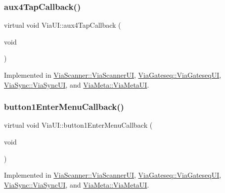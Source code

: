 \mbox{\label{class_via_u_i_a0a43c527f027d11b266080d8cacb1d65}} 
\subsubsection{\texorpdfstring{aux4\+Tap\+Callback()}{aux4TapCallback()}}
{\footnotesize\ttfamily virtual void Via\+U\+I\+::aux4\+Tap\+Callback (\begin{DoxyParamCaption}\item[{void}]{ }\end{DoxyParamCaption})\hspace{0.3cm}{\ttfamily [pure virtual]}}



Implemented in \mbox{\hyperlink{class_via_scanner_1_1_via_scanner_u_i_a8c20c03c838257da356f0071dfcbfd36}{Via\+Scanner\+::\+Via\+Scanner\+UI}}, \mbox{\hyperlink{class_via_gateseq_1_1_via_gateseq_u_i_af12df5bd6d6bb9b069e8c410fcae7473}{Via\+Gateseq\+::\+Via\+Gateseq\+UI}}, \mbox{\hyperlink{class_via_sync_1_1_via_sync_u_i_a1cf7ef02457d9f7887da0721799aadc0}{Via\+Sync\+::\+Via\+Sync\+UI}}, and \mbox{\hyperlink{class_via_meta_1_1_via_meta_u_i_ad8e6300990d654091672b0f94a9b47d8}{Via\+Meta\+::\+Via\+Meta\+UI}}.

\mbox{\label{class_via_u_i_ae00249c10af94437c357222328a56f82}} 
\subsubsection{\texorpdfstring{button1\+Enter\+Menu\+Callback()}{button1EnterMenuCallback()}}
{\footnotesize\ttfamily virtual void Via\+U\+I\+::button1\+Enter\+Menu\+Callback (\begin{DoxyParamCaption}\item[{void}]{ }\end{DoxyParamCaption})\hspace{0.3cm}{\ttfamily [pure virtual]}}



Implemented in \mbox{\hyperlink{class_via_scanner_1_1_via_scanner_u_i_a10b9a54f4fb6ea88203d53041093d650}{Via\+Scanner\+::\+Via\+Scanner\+UI}}, \mbox{\hyperlink{class_via_gateseq_1_1_via_gateseq_u_i_aa4ce0e46aeda7bea4ec2a09bbca2abac}{Via\+Gateseq\+::\+Via\+Gateseq\+UI}}, \mbox{\hyperlink{class_via_sync_1_1_via_sync_u_i_a2082d2d4a5ef8cbbaa2a1d8a387b3cad}{Via\+Sync\+::\+Via\+Sync\+UI}}, and \mbox{\hyperlink{class_via_meta_1_1_via_meta_u_i_a5e9d82c9c06759dd2cc3b48846e594f2}{Via\+Meta\+::\+Via\+Meta\+UI}}.

